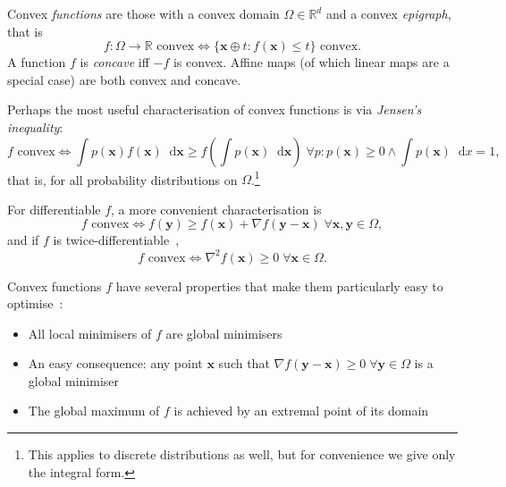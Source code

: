 \documentclass[10pt, a4paper]{article}
\numberwithin{equation}{section} %
\theoremstyle{definition}
\theoremstyle{plain}
\newcommand{\dif}{\mathop{}\!\mathrm{d}} %
\newcommand{\?}{\mathrel{?}} %
\newcommand{\R}{\mathbb{R}} %
\newcommand{\cvec}[1]{\boldsymbol{\mathbf{#1}}}    %
\begin{document}
\begin{appendices}
                          Convex \emph{functions} are those with a convex domain \(\Omega\in\R^d\) and a convex \emph{epigraph}, that is
                          \begin{equation}
                            f : \Omega \to \R \text{ convex} \Leftrightarrow \{\cvec{x} \oplus t : f(\cvec{x}) \leq t\}\text{ convex}. 
                          \end{equation}
                          A function \(f\) is \emph{concave} iff \(-f\) is convex. Affine maps (of which linear maps are a special case) are both convex and concave.

                          Perhaps the most useful characterisation of convex functions is via \emph{Jensen's inequality}:
                          \begin{equation}
                            f\text{ convex} \Leftrightarrow \int p(\cvec{x}) f(\cvec{x}) \dif{\cvec{x}} \geq f\left(\int p(\cvec{x}) \dif{\cvec{x}}\right)\;\forall p: p(\cvec{x}) \geq 0 \land \int p(\cvec{x}) \dif{x} = 1,
                          \end{equation}
                          that is, for all probability distributions on \(\Omega\).\footnote{This applies to discrete distributions as well, but for convenience we give only the integral form.}

                          For differentiable \(f\), a more convenient characterisation is~\cite[Ch. 7.4]{LuenbergerYe}
                          \begin{equation}
                            f\text{ convex} \Leftrightarrow f(\cvec{y}) \geq f(\cvec{x}) + \nabla{f}(\cvec{y}-\cvec{x}) \;\forall \cvec{x},\cvec{y} \in \Omega,
                          \end{equation}
                          and if \(f\) is twice-differentiable~\cite[Ch. 7.4]{LuenbergerYe},
                          \begin{equation}
                            f\text{ convex} \Leftrightarrow \nabla^2{f}(\cvec{x}) \geq 0 \;\forall \cvec{x} \in \Omega.
                          \end{equation}

                          Convex functions \(f\) have several properties that make them particularly easy to optimise~\cite[Ch. 7.5]{LuenbergerYe}:
                          \begin{itemize}
                            \item All local minimisers of \(f\) are global minimisers
                            \item An easy consequence: any point \(\cvec{x}\) such that \(\nabla{f}(\cvec{y}-\cvec{x}) \geq 0\;\forall \cvec{y}\in\Omega\) is a global minimiser
                            \item The global maximum of \(f\) is achieved by an extremal point of its domain
                          \end{itemize}


\end{appendices}
\end{document}
